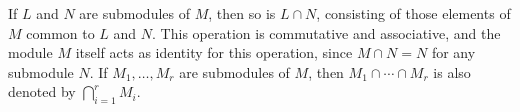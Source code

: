 If $L$ and $N$ are submodules of $M$, then so is $L \cap N$, consisting of those elements of $M$ common to $L$ and $N$. This operation is commutative and associative, and the module $M$ itself acts as identity for this operation, since $M \cap N = N$ for any submodule $N$. If $M_1, \dots, M_r$ are submodules of $M$, then $M_1 \cap \cdots \cap M_r$ is also denoted by $\bigcap_{i=1}^r M_i$.
